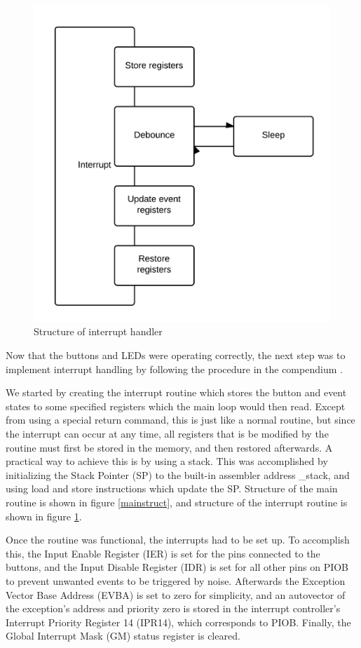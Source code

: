 \begin{figure}
  \centering
    \includegraphics[height=0.4\textheight]{Interrupt}
  \caption{Structure of interrupt handler}
  \label{interruptstruct}
\end{figure}


Now that the buttons and LEDs were operating correctly, the next step was to implement interrupt handling by following the procedure in the compendium \cite[Section 2.5.2]{compendium}.

We started by creating the interrupt routine which stores the button and event states to some specified registers which the main loop would then read. Except from using a special return command, this is just like a normal routine, but since the interrupt can occur at any time, all registers that is be modified by the routine must first be stored in the memory, and then restored afterwards. A practical way to achieve this is by using a stack. This was accomplished by initializing the Stack Pointer (SP) to the built-in assembler address \_stack, and using load and store instructions which update the SP. Structure of the main routine is shown in figure \ref{mainstruct}, and structure of the interrupt routine is shown in figure \ref{interruptstruct}.

Once the routine was functional, the interrupts had to be set up. To accomplish this, the Input Enable Register (IER) is set for the pins connected to the buttons, and the Input Disable Register (IDR) is set for all other pins on PIOB to prevent unwanted events to be triggered by noise. Afterwards the Exception Vector Base Address (EVBA) is set to zero for simplicity, and an autovector of the exception’s address and priority zero is stored in the interrupt controller’s Interrupt Priority Register 14 (IPR14), which corresponds to PIOB. Finally, the Global Interrupt Mask (GM) status register is cleared.

